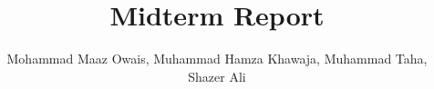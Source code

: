 \documentclass[pageno]{jpaper}
\begin{document}
\date{}

\title{Midterm Report}
\author{Mohammad Maaz Owais, Muhammad Hamza Khawaja, Muhammad Taha, Shazer Ali}

\maketitle



% 
% 
% 
\newpage



\end{document}
